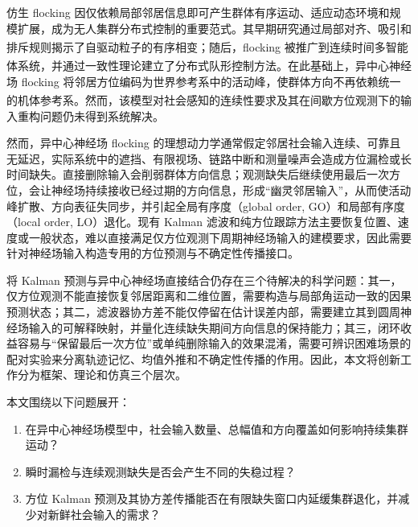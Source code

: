 \documentclass[UTF8,fontset=windows,11pt]{ctexart}
\newcommand{\upcite}[1]{\textsuperscript{\cite{#1}}}
\begin{document}
仿生 flocking 因仅依赖局部邻居信息即可产生群体有序运动、适应动态环境和规模扩展，成为无人集群分布式控制的重要范式。其早期研究通过局部对齐、吸引和排斥规则揭示了自驱动粒子的有序相变\upcite{Vicsek1995}；随后，flocking 被推广到连续时间多智能体系统，并通过一致性理论建立了分布式队形控制方法\upcite{OlfatiSaber2006}。在此基础上，异中心神经场 flocking 将邻居方位编码为世界参考系中的活动峰，使群体方向不再依赖统一的机体参考系\upcite{Salahshour2025}。然而，该模型对社会感知的连续性要求及其在间歇方位观测下的输入重构问题仍未得到系统解决。

然而，异中心神经场 flocking 的理想动力学通常假定邻居社会输入连续、可靠且无延迟，实际系统中的遮挡、有限视场、链路中断和测量噪声会造成方位漏检或长时间缺失。直接删除输入会削弱群体方向信息；观测缺失后继续使用最后一次方位，会让神经场持续接收已经过期的方向信息，形成“幽灵邻居输入”，从而使活动峰扩散、方向表征失同步，并引起全局有序度（global order, GO）和局部有序度（local order, LO）退化。现有 Kalman 滤波和纯方位跟踪方法主要恢复位置、速度或一般状态，难以直接满足仅方位观测下周期神经场输入的建模要求，因此需要针对神经场输入构造专用的方位预测与不确定性传播接口。

将 Kalman 预测与异中心神经场直接结合仍存在三个待解决的科学问题：其一，仅方位观测不能直接恢复邻居距离和二维位置，需要构造与局部角运动一致的因果预测状态；其二，滤波器协方差不能仅停留在估计误差内部，需要建立其到圆周神经场输入的可解释映射，并量化连续缺失期间方向信息的保持能力；其三，闭环收益容易与“保留最后一次方位”或单纯删除输入的效果混淆，需要可辨识困难场景的配对实验来分离轨迹记忆、均值外推和不确定性传播的作用。因此，本文将创新工作分为框架、理论和仿真三个层次。

本文围绕以下问题展开：
\begin{enumerate}[label=(\arabic*)]
  \item 在异中心神经场模型中，社会输入数量、总幅值和方向覆盖如何影响持续集群运动？
  \item 瞬时漏检与连续观测缺失是否会产生不同的失稳过程？
  \item 方位 Kalman 预测及其协方差传播能否在有限缺失窗口内延缓集群退化，并减少对新鲜社会输入的需求？
\end{enumerate}
\end{document}
